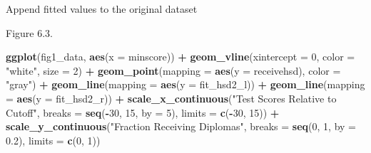 \documentclass[]{book}
\newenvironment{Shaded}{\begin{snugshade}}{\end{snugshade}}
\newcommand{\DataTypeTok}[1]{\textcolor[rgb]{0.13,0.29,0.53}{#1}}
\newcommand{\DecValTok}[1]{\textcolor[rgb]{0.00,0.00,0.81}{#1}}
\newcommand{\FloatTok}[1]{\textcolor[rgb]{0.00,0.00,0.81}{#1}}
\newcommand{\KeywordTok}[1]{\textcolor[rgb]{0.13,0.29,0.53}{\textbf{#1}}}
\newcommand{\NormalTok}[1]{#1}
\newcommand{\OperatorTok}[1]{\textcolor[rgb]{0.81,0.36,0.00}{\textbf{#1}}}
\newcommand{\OtherTok}[1]{\textcolor[rgb]{0.56,0.35,0.01}{#1}}
\newcommand{\StringTok}[1]{\textcolor[rgb]{0.31,0.60,0.02}{#1}}
\theoremstyle{definition}
\theoremstyle{definition}
\theoremstyle{definition}
\theoremstyle{remark}
\begin{document}
Append fitted values to the original dataset

\begin{Shaded}
\end{Shaded}

Figure 6.3.

\begin{Shaded}
\begin{Highlighting}[]
\KeywordTok{ggplot}\NormalTok{(fig1_data, }\KeywordTok{aes}\NormalTok{(}\DataTypeTok{x =}\NormalTok{ minscore)) }\OperatorTok{+}
\StringTok{  }\KeywordTok{geom_vline}\NormalTok{(}\DataTypeTok{xintercept =} \DecValTok{0}\NormalTok{, }\DataTypeTok{color =} \StringTok{"white"}\NormalTok{, }\DataTypeTok{size =} \DecValTok{2}\NormalTok{) }\OperatorTok{+}
\StringTok{  }\KeywordTok{geom_point}\NormalTok{(}\DataTypeTok{mapping =} \KeywordTok{aes}\NormalTok{(}\DataTypeTok{y =}\NormalTok{ receivehsd), }\DataTypeTok{color =} \StringTok{"gray"}\NormalTok{) }\OperatorTok{+}
\StringTok{  }\KeywordTok{geom_line}\NormalTok{(}\DataTypeTok{mapping =} \KeywordTok{aes}\NormalTok{(}\DataTypeTok{y =}\NormalTok{ fit_hsd2_l)) }\OperatorTok{+}
\StringTok{  }\KeywordTok{geom_line}\NormalTok{(}\DataTypeTok{mapping =} \KeywordTok{aes}\NormalTok{(}\DataTypeTok{y =}\NormalTok{ fit_hsd2_r)) }\OperatorTok{+}
\StringTok{  }\KeywordTok{scale_x_continuous}\NormalTok{(}\StringTok{"Test Scores Relative to Cutoff"}\NormalTok{,}
                     \DataTypeTok{breaks =} \KeywordTok{seq}\NormalTok{(}\OperatorTok{-}\DecValTok{30}\NormalTok{, }\DecValTok{15}\NormalTok{, }\DataTypeTok{by =} \DecValTok{5}\NormalTok{), }\DataTypeTok{limits =} \KeywordTok{c}\NormalTok{(}\OperatorTok{-}\DecValTok{30}\NormalTok{, }\DecValTok{15}\NormalTok{)) }\OperatorTok{+}
\StringTok{  }\KeywordTok{scale_y_continuous}\NormalTok{(}\StringTok{"Fraction Receiving Diplomas"}\NormalTok{,}
                     \DataTypeTok{breaks =} \KeywordTok{seq}\NormalTok{(}\DecValTok{0}\NormalTok{, }\DecValTok{1}\NormalTok{, }\DataTypeTok{by =} \FloatTok{0.2}\NormalTok{), }\DataTypeTok{limits =} \KeywordTok{c}\NormalTok{(}\DecValTok{0}\NormalTok{, }\DecValTok{1}\NormalTok{))}
\end{Highlighting}
\end{Shaded}
\end{document}
